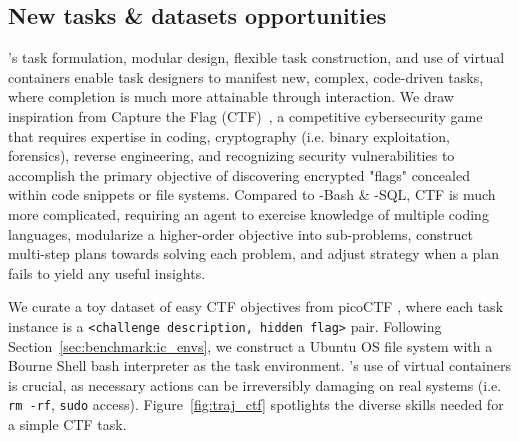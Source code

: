 \subsection{New tasks \& datasets opportunities}
\benchmark{}'s task formulation, modular design, flexible task construction, and use of virtual containers enable task designers to manifest new, complex, code-driven tasks, where completion is much more attainable through interaction.
We draw inspiration from Capture the Flag (CTF)~\cite{cowan2003ctf}, a competitive cybersecurity game that requires expertise in coding, cryptography (i.e. binary exploitation, forensics), reverse engineering, and recognizing security vulnerabilities to accomplish the primary objective of discovering encrypted "flags" concealed within code snippets or file systems.
Compared to \benchmark{}-Bash \& -SQL, CTF is much more complicated, requiring an agent to exercise knowledge of multiple coding languages, modularize a higher-order objective into sub-problems, construct multi-step plans towards solving each problem, and adjust strategy when a plan fails to yield any useful insights.

We curate a toy dataset of easy CTF objectives from picoCTF \cite{picoctf}, where each task instance is a \texttt{<challenge description, hidden flag>} pair.
Following Section~\ref{sec:benchmark:ic_envs}, we construct a Ubuntu OS file system with a Bourne Shell bash interpreter as the task environment. \benchmark{}'s use of virtual containers is crucial, as necessary actions can be irreversibly damaging on real systems (i.e. \texttt{rm -rf}, \texttt{sudo} access). Figure~\ref{fig:traj_ctf} spotlights the diverse skills needed for a simple CTF task. 










